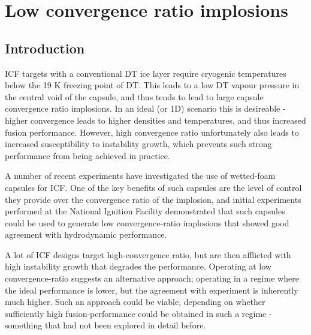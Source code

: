 

\chapter{\label{ch-lowCR}Low convergence ratio implosions}

\minitoc

\section{Introduction}

ICF targets with a conventional DT ice layer require cryogenic temperatures below the 19 K freezing point of DT. This leads to a low DT vapour pressure in the central void of the capsule, and thus tends to lead to large capsule convergence ratio implosions. In an ideal (or 1D) scenario this is desireable - higher convergence leads to higher densities and temperatures, and thus increased fusion performance. However, high convergence ratio unfortunately also leads to increased susceptibility to instability growth, which prevents such strong performance from being achieved in practice.

A number of recent experiments have investigated the use of wetted-foam capsules for ICF. One of the key benefits of such capsules are the level of control they provide over the convergence ratio of the implosion, and initial experiments performed at the National Ignition Facility demonstrated that such capsules could be used to generate low convergence-ratio implosions that showed good agreement with hydrodynamic performance.

A lot of ICF designs target high-convergence ratio, but are then afflicted with high instability growth that degrades the performance. Operating at low convergence-ratio suggests an alternative approach; operating in a regime where the ideal performance is lower, but the agreement with experiment is inherently much higher. Such an approach could be viable, depending on whether sufficiently high fusion-performance could be obtained in such a regime - something that had not been explored in detail before. 

